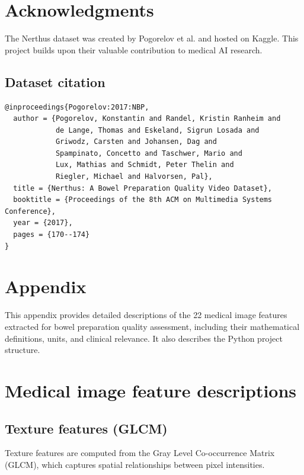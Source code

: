 \documentclass[11pt]{article}
\begin{document}
\section*{Acknowledgments}

The Nerthus dataset was created by Pogorelov et al. and hosted on Kaggle. This project builds upon their valuable contribution to medical AI research.

\subsection*{Dataset citation}
\begin{verbatim}
@inproceedings{Pogorelov:2017:NBP,
  author = {Pogorelov, Konstantin and Randel, Kristin Ranheim and 
            de Lange, Thomas and Eskeland, Sigrun Losada and 
            Griwodz, Carsten and Johansen, Dag and 
            Spampinato, Concetto and Taschwer, Mario and 
            Lux, Mathias and Schmidt, Peter Thelin and 
            Riegler, Michael and Halvorsen, Pal},
  title = {Nerthus: A Bowel Preparation Quality Video Dataset},
  booktitle = {Proceedings of the 8th ACM on Multimedia Systems Conference},
  year = {2017},
  pages = {170--174}
}
\end{verbatim}

\appendix
\section{Appendix}
\label{app:appendix}

This appendix provides detailed descriptions of the 22 medical image features extracted for bowel preparation quality assessment, including their mathematical definitions, units, and clinical relevance. It also describes the Python project structure.

\section{Medical image feature descriptions}
\label{app:feature_descriptions}

\subsection{Texture features (GLCM)}

Texture features are computed from the Gray Level Co-occurrence Matrix (GLCM), which captures spatial relationships between pixel intensities.
\end{document}

